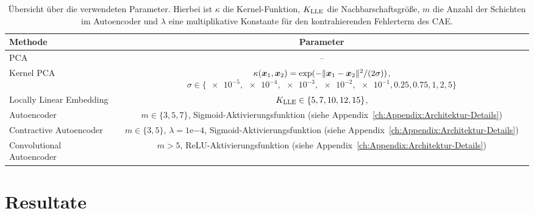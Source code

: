 \begin{table}[ht]
	\tymax=300pt
	\centering
	\begin{tabulary}{\linewidth}{LC}
		\toprule
		Methode                            & Parameter                                                            \\ \midrule
		PCA      & --                                                                   \\
		Kernel PCA                         & $\kappa(\bm{x}_1, \bm{x}_2) = \exp(- \lVert\bm{x}_1 - \bm{x}_2\rVert^2/(2\sigma))$, $\sigma \in \{\num{e-5},\num{e-4}, \num{e-3}, \num{e-2}, \num{e-1}, 0.25, 0.75, 1, 2, 5\}$ \\
		Locally Linear Embedding     & $K_{\text{LLE}} \in \{ 5, 7, 10, 12, 15\}$,                      \\
		Autoencoder                  & $m \in \{3, 5, 7\}$, Sigmoid-Aktivierungsfunktion \newline (siehe
		Appendix~\ref{ch:Appendix:Architektur-Details})                                                           \\  Contractive Autoencoder & $m \in \{3, 5\}$, $\lambda=1\mathrm{e}{-4}$,
		Sigmoid-Aktivierungsfunktion (siehe Appendix~\ref{ch:Appendix:Architektur-Details})                       \\
		Convolutional Autoencoder & $m > 5$, ReLU-Aktivierungsfunktion \newline (siehe
		Appendix~\ref{ch:Appendix:Architektur-Details})                                                           \\ \bottomrule
	\end{tabulary}
	\caption[Übersicht über die verwendeten Parameter der Methoden]{Übersicht über die verwendeten Parameter. Hierbei ist $\kappa$ die Kernel-Funktion, $K_{\text{LLE}}$ die Nachbarschaftsgröße, $m$ die Anzahl der Schichten im Autoencoder und $\lambda$ eine multiplikative Konstante für den kontrahierenden Fehlerterm des CAE.}
	\label{tab:uebersicht-parameter}
\end{table}
\section{Resultate}
\label{ch:Vergleich:sec:Resultate}

